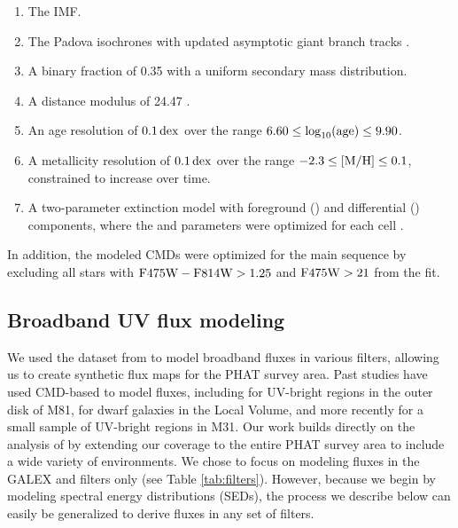 \documentclass[iop, tighten]{emulateapj}
\begin{document}
\begin{enumerate}
\item The \citet{Kroupa:2001} IMF.
\item The Padova isochrones \citep{Marigo:2008} with updated asymptotic giant
    branch tracks \citep{Girardi:2010}.
\item A binary fraction of 0.35 with a uniform secondary mass distribution.
\item A distance modulus of 24.47 \citep{McConnachie:2005}.
\item An age resolution of $0.1\,\mathrm{dex}$ over the range $6.60 \le
    \log_{10}(\mathrm{age}) \le 9.90$.
\item A metallicity resolution of $0.1\,\mathrm{dex}$ over the range $-2.3 \le \mathrm{[M/H]} \le
    0.1$, constrained to increase over time.
\item A two-parameter extinction model with foreground (\avf{}) and
    differential (\dav{}) components, where the \avf{} and \dav{} parameters
    were optimized for each cell \citep[see also][]{Simones:2014}.
\end{enumerate}

In addition, the modeled CMDs were optimized for the main sequence by excluding
all stars with $\mathrm{F475W} - \mathrm{F814W} > 1.25$ and $\mathrm{F475W} > 21$ from the fit.



\subsection{Broadband UV flux modeling}\label{syntheticfluxmaps:fluxmod}

We used the \sfh{} dataset from \citet{Lewis:2014} to model broadband fluxes in
various filters, allowing us to create synthetic flux maps for the PHAT survey
area. Past studies have used CMD-based  to model fluxes, including
\citet{Gogarten:2009} for UV-bright regions in the outer disk of M81,
\citet{Johnson:2013} for dwarf galaxies in the Local Volume, and more recently
\citet{Simones:2014} for a small sample of UV-bright regions in M31. Our work
builds directly on the analysis of \citet{Simones:2014} by extending our
coverage to the entire PHAT survey area to include a wide variety of
environments. We chose to focus on modeling fluxes in the GALEX \fuv{} and
\nuv{} filters only (see Table \ref{tab:filters}). However, because we begin by
modeling spectral energy distributions (SEDs), the process we describe below
can easily be generalized to derive fluxes in any set of filters.
\end{document}

